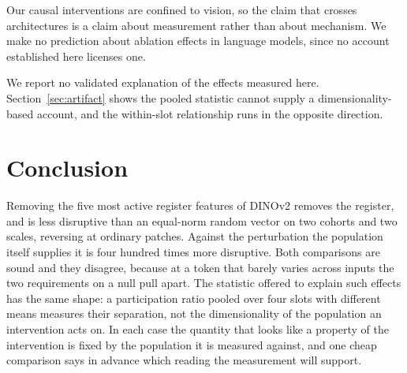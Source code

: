 \documentclass{article}
\begin{document}
Our causal interventions are confined to vision, so the claim that crosses architectures is a claim about measurement rather than about mechanism. We make no prediction about ablation effects in language models, since no account established here licenses one.

We report no validated explanation of the effects measured here. Section~\ref{sec:artifact} shows the pooled statistic cannot supply a dimensionality-based account, and the within-slot relationship runs in the opposite direction.

\section{Conclusion}

Removing the five most active register features of DINOv2 removes the register, and is less disruptive than an equal-norm random vector on two cohorts and two scales, reversing at ordinary patches. Against the perturbation the population itself supplies it is four hundred times more disruptive. Both comparisons are sound and they disagree, because at a token that barely varies across inputs the two requirements on a null pull apart. The statistic offered to explain such effects has the same shape: a participation ratio pooled over four slots with different means measures their separation, not the dimensionality of the population an intervention acts on. In each case the quantity that looks like a property of the intervention is fixed by the population it is measured against, and one cheap comparison says in advance which reading the measurement will support.



\end{document}
